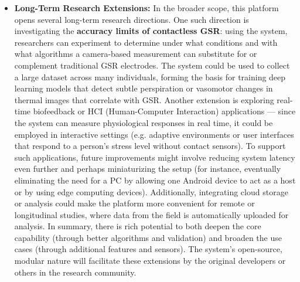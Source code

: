 \documentclass[11pt,a4paper]{report}
\begin{document}
\begin{itemize}
\item \textbf{Long-Term Research Extensions:} In the broader scope, this platform
  opens several long-term research directions. One such direction is
  investigating the \textbf{accuracy limits of contactless GSR}: using the
  system, researchers can experiment to determine under what conditions
  and with what algorithms a camera-based measurement can substitute for
  or complement traditional GSR electrodes. The system could be used to
  collect a large dataset across many individuals, forming the basis for
  training deep learning models that detect subtle perspiration or
  vasomotor changes in thermal images that correlate with GSR. Another
  extension is exploring real-time biofeedback or HCI (Human-Computer
  Interaction) applications --- since the system can measure
  physiological responses in real time, it could be employed in
  interactive settings (e.g. adaptive environments or user interfaces
  that respond to a person's stress level without contact sensors). To
  support such applications, future improvements might involve reducing
  system latency even further and perhaps miniaturizing the setup (for
  instance, eventually eliminating the need for a PC by allowing one
  Android device to act as a host or by using edge computing devices).
  Additionally, integrating cloud storage or analysis could make the
  platform more convenient for remote or longitudinal studies, where
  data from the field is automatically uploaded for analysis. In
  summary, there is rich potential to both deepen the core capability
  (through better algorithms and validation) and broaden the use cases
  (through additional features and sensors). The system's open-source,
  modular nature will facilitate these extensions by the original
  developers or others in the research community.

\end{itemize}


\end{document}
